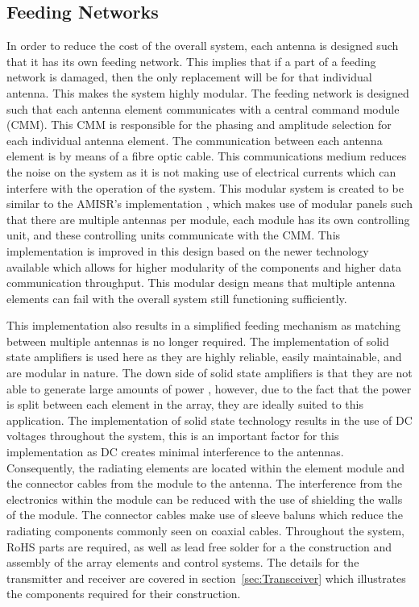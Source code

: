 \documentclass[11pt]{witseiepaper}
\begin{document}
\begin{bibunit}[witseie]
\subsection{Feeding Networks} \label{sec:FeedingNetworks}
In order to reduce the cost of the overall system, each antenna is designed such that it has its own feeding network. This implies that if a part of a feeding network is damaged, then the only replacement will be for that individual antenna. This makes the system highly modular. 
The feeding network is designed such that each antenna element communicates with a central command module (CMM). This CMM is responsible for the phasing and amplitude selection for each individual antenna element.
The communication between each antenna element is by means of a fibre optic cable. This communications medium reduces the noise on the system as it is not making use of electrical currents which can interfere with the operation of the system.
This modular system is created to be similar to the AMISR's implementation \cite{AMISR}, which makes use of modular panels such that there are multiple antennas per module, each module has its own controlling unit, and these controlling units communicate with the CMM.
This implementation is improved in this design based on the newer technology available which allows for higher modularity of the components and higher data communication throughput.
This modular design means that multiple antenna elements can fail with the overall system still functioning sufficiently.

This implementation also results in a simplified feeding mechanism as matching between multiple antennas is no longer required.
The implementation of solid state amplifiers is used here as they are highly reliable, easily maintainable, and are modular in nature. The down side of solid state amplifiers is that they are not able to generate large amounts of power \cite[p.~364]{radarHandbook}, however, due to the fact that the power is split between each element in the array, they are ideally suited to this application. The implementation of solid state technology results in the use of DC voltages throughout the system, this is an important factor for this implementation as DC creates minimal interference to the antennas.
Consequently, the radiating elements are located within the element module and the connector cables from the module to the antenna.
The interference from the electronics within the module can be reduced with the use of shielding the walls of the module. The connector cables make use of sleeve baluns which reduce the radiating components commonly seen on coaxial cables.
Throughout the system, RoHS parts are required, as well as lead free solder for a the construction and assembly of the array elements and control systems. 
The details for the transmitter and receiver are covered in section~\ref{sec:Transceiver} which illustrates the components required for their construction.


\end{bibunit}
\end{document}
